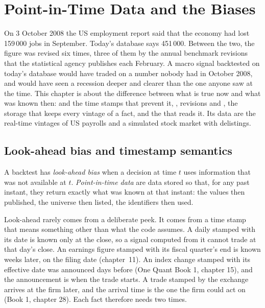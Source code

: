 \chapter{Point-in-Time Data and the Biases}\label{ch:rs:point-in-time-data-and-the-biases}

On 3 October 2008 the US employment report said that the economy had lost 159\,000 jobs in September. Today's database says
451\,000. Between the two, the figure was revised six times, three of them by the annual benchmark revisions that the
statistical agency publishes each February. A macro signal backtested on
today's database would have traded on a number nobody had in October 2008, and would have seen a recession deeper and clearer
than the one anyone saw at the time. This chapter is about the difference between what is true now and what was known then:
 and the time stamps that prevent it, , revisions and , the storage that keeps
every vintage of a fact, and the  that reads it. Its data are the real-time vintages of US payrolls and a
simulated stock market with delistings.

\section{Look-ahead bias and timestamp semantics}

\begin{definition}\label{def:rs:point-in-time-data-and-the-biases:lookahead}
A backtest has \emph{look-ahead bias} when a decision at time $t$ uses information that was not
available at $t$. \emph{Point-in-time data} are data stored so that, for any past instant, they
return exactly what was known at that instant: the values then published, the universe then listed, the identifiers then
used.
\end{definition}

Look-ahead rarely comes from a deliberate peek. It comes from a time stamp that means something other than what the code
assumes. A daily  stamped with its date is known only at the close, so a signal computed from it cannot trade at that
day's close. An earnings figure stamped with its fiscal quarter's end is known weeks later, on the filing date (chapter~11).
An index change stamped with its effective date was announced days before (One Quant Book 1, chapter 15), and the
announcement is when the trade starts. A trade stamped by the exchange arrives at the firm later, and the arrival time is the
one the firm could act on (Book 1, chapter 28). Each fact therefore needs two times.

